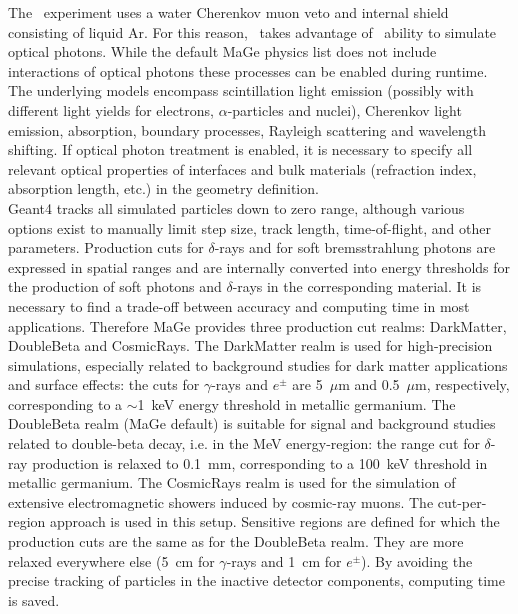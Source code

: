 \documentclass[article]{IEEEtran}
\begin{document}
The \Gerda\ experiment uses a water Cherenkov muon veto and internal 
shield consisting of liquid Ar. For this reason, \MaGe\ takes advantage of 
\GF\ ability to simulate optical
photons. While the default {\sc MaGe} physics list does not include
interactions of optical photons these processes can be enabled during
runtime. The underlying models encompass scintillation light emission
(possibly with different light yields for electrons,
$\alpha$-particles and nuclei), Cherenkov light emission, absorption,
boundary processes, Rayleigh scattering and wavelength shifting. 
If optical photon treatment is enabled, it is
necessary to specify all relevant optical properties of interfaces and
bulk materials (refraction index, absorption length, etc.) in the
geometry definition. \\

{\sc Geant4} tracks all simulated particles down to zero range, although
various options exist to manually limit step size, track length, time-of-flight, 
and other parameters. Production cuts for
$\delta$-rays and for soft bremsstrahlung photons are
expressed in spatial ranges and are internally converted into energy
thresholds for the production of soft photons and $\delta$-rays in the
corresponding material. It is necessary to find a trade-off between
accuracy and computing time in most applications. Therefore {\sc MaGe}
provides three production cut realms: DarkMatter, DoubleBeta and
CosmicRays. The DarkMatter realm is used for high-precision
simulations, especially related to background studies for dark matter
applications and surface effects: the cuts for $\gamma$-rays and $e^{\pm}$  
are 5~$\mu$m and 0.5~$\mu$m, respectively, corresponding to
a $\sim$1~keV energy threshold in metallic germanium. The DoubleBeta realm
({\sc MaGe} default) is suitable for signal and background studies
related to double-beta decay, i.e. in the MeV energy-region: the
range cut for $\delta$-ray production is relaxed to 0.1~mm,
corresponding to a 100~keV threshold in metallic germanium. The
CosmicRays realm is used for the simulation of extensive
electromagnetic showers induced by cosmic-ray muons. The
cut-per-region approach is used in this setup. Sensitive regions are
defined for which the production cuts are the same as for the
DoubleBeta realm. They are more relaxed everywhere else (5~cm for
$\gamma$-rays and 1~cm for $e^{\pm}$). By avoiding the
precise tracking of particles in the inactive detector components,
computing time is saved. \\
\end{document}
